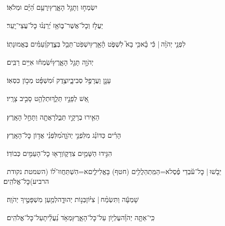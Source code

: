 \documentclass[12pt]{article}
\newcommand{\loc}[1]{\textsuperscript{\locf{#1}}}
\begin{document}
{\loc{ יא}~}‏יִשְׂמְח֣וּ  וְתָגֵ֣ל הָאָ֑רֶץ{\hfill}יִֽרְעַ֥ם הַ֝יָּ֗ם וּמְלֹאֽוֹ׃\par

{\loc{ יב}~}‏יַעֲלֹ֣ז  וְכׇל־אֲשֶׁר־בּ֑וֹ{\hfill}אָ֥ז יְ֝רַנְּנ֗וּ כׇּל־עֲצֵי־יָֽעַר׃\par

{\loc{ יג}~}‏לִפְנֵ֤י יְהֹוָ֨ה |  כִּ֬י בָ֗א{\hfill}כִּ֥י בָא֮ לִשְׁפֹּ֢ט הָ֫אָ֥רֶץ\newline\hspace*{.5em}יִשְׁפֹּֽט־תֵּבֵ֥ל בְּצֶ֑דֶק{\hfill}וְ֝עַמִּ֗ים בֶּאֱמוּנָתֽוֹ׃\par\pend
\ledpb
\pstart[\subsection*{\textcolor{red}{פרק צז}}]\label{פרק צז}
{\loc{ א}~}‏יְהֹוָ֣ה  תָּגֵ֣ל הָאָ֑רֶץ{\hfill}יִ֝שְׂמְח֗וּ אִיִּ֥ים רַבִּֽים׃\par

{\loc{ ב}~}‏עָנָ֣ן וַעֲרָפֶ֣ל סְבִיבָ֑יו{\hfill}צֶ֥דֶק וּ֝מִשְׁפָּ֗ט מְכ֣וֹן כִּסְאֽוֹ׃\par

{\loc{ ג}~}‏אֵ֭שׁ לְפָנָ֣יו תֵּלֵ֑ךְ{\hfill}וּתְלַהֵ֖ט סָבִ֣יב צָרָֽיו׃\par

{\loc{ ד}~}‏הֵאִ֣ירוּ בְרָקָ֣יו תֵּבֵ֑ל{\hfill}רָאֲתָ֖ה וַתָּחֵ֣ל הָאָֽרֶץ׃\par

{\loc{ ה}~}‏הָרִ֗ים כַּדּוֹנַ֗ג  מִלִּפְנֵ֣י יְהֹוָ֑ה{\hfill}מִ֝לִּפְנֵ֗י אֲד֣וֹן כׇּל־הָאָֽרֶץ׃\par

{\loc{ ו}~}‏הִגִּ֣ידוּ הַשָּׁמַ֣יִם צִדְק֑וֹ{\hfill}וְרָא֖וּ כׇל־הָעַמִּ֣ים כְּבוֹדֽוֹ׃\par

{\loc{ ז}~}‏יֵבֹ֤שׁוּ |  כׇּל־עֹ֬בְדֵי פֶ֗סֶל{\hfill}א=הַמִּֽתְהַלֲלִ֥ים (חטף) בָּאֱלִילִ֑ים\newline\hspace*{.5em}א=הִשְׁתַּחֲווּ־ל֝וֹ (השמטת נקודת הרביע){\hfill}כׇּל־אֱלֹהִֽים׃\par

{\loc{ ח}~}‏שָׁמְעָ֬ה וַתִּשְׂמַ֨ח |  צִיּ֗וֹן{\hfill}\newline\hspace*{.5em}בְּנ֣וֹת יְהוּדָ֑ה{\hfill}לְמַ֖עַן מִשְׁפָּטֶ֣יךָ יְהֹוָֽה׃\par

{\loc{ ט}~}‏כִּֽי־אַתָּ֤ה יְהֹוָ֗ה{\hfill}עֶלְי֥וֹן עַל־כׇּל־הָאָ֑רֶץ\newline\hspace*{.5em}מְאֹ֥ד נַ֝עֲלֵ֗יתָ{\hfill}עַל־כׇּל־אֱלֹהִֽים׃\par
\end{document}
